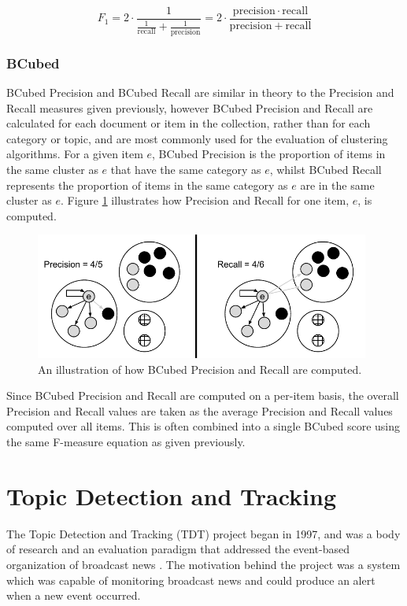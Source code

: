 \begin{displaymath}
	F_1 = 2 \cdot \frac{1}{\tfrac{1}{\mathrm{recall}} + \tfrac{1}{\mathrm{precision}}} = 2 \cdot \frac{\mathrm{precision} \cdot \mathrm{recall}}{\mathrm{precision} + \mathrm{recall}}
\end{displaymath}

\subsubsection{BCubed}
\label{background:bcubed}
BCubed Precision and BCubed Recall are similar in theory to the Precision and Recall measures given previously, however BCubed Precision and Recall are calculated for each document or item in the collection, rather than for each category or topic, and are most commonly used for the evaluation of clustering algorithms.
For a given item $e$, BCubed Precision is the proportion of items in the same cluster as $e$ that have the same category as $e$, whilst BCubed Recall represents the proportion of items in the same category as $e$ are in the same cluster as $e$.
Figure \ref{background:graphic:bcubed} illustrates how Precision and Recall for one item, $e$, is computed.

\vspace{0.5cm}
\begin{figure}[h!]
	\centering
	\includegraphics[width=11cm]{Chapters/Background/bcubed.pdf}
	\caption{An illustration of how BCubed Precision and Recall are computed.}
	\label{background:graphic:bcubed}
\end{figure}

Since BCubed Precision and Recall are computed on a per-item basis, the overall Precision and Recall values are taken as the average Precision and Recall values computed over all items.
This is often combined into a single BCubed score using the same F-measure equation as given previously.

\section{Topic Detection and Tracking}
The Topic Detection and Tracking (TDT) project began in 1997, and was a body of research and an evaluation paradigm that addressed the event-based organization of broadcast news \citep{Allan:2002:ITD:772260.772262}.
The motivation behind the project was a system which was capable of monitoring broadcast news and could produce an alert when a new event occurred.

